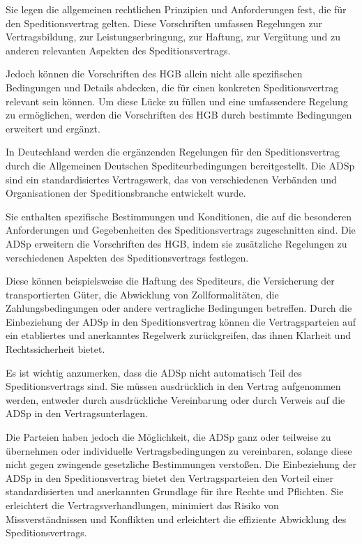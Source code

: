 Sie legen die allgemeinen rechtlichen Prinzipien und Anforderungen fest, die für den Speditionsvertrag gelten.
Diese Vorschriften umfassen Regelungen zur Vertragsbildung, zur Leistungserbringung, zur Haftung, zur Vergütung und zu anderen relevanten Aspekten des Speditionsvertrags.

Jedoch können die Vorschriften des HGB allein nicht alle spezifischen Bedingungen und Details abdecken, die für einen konkreten Speditionsvertrag relevant sein können.
Um diese Lücke zu füllen und eine umfassendere Regelung zu ermöglichen, werden die Vorschriften des HGB durch bestimmte Bedingungen erweitert und ergänzt.

In Deutschland werden die ergänzenden Regelungen für den Speditionsvertrag durch die Allgemeinen Deutschen Spediteurbedingungen bereitgestellt.
Die ADSp sind ein standardisiertes Vertragswerk, das von verschiedenen Verbänden und Organisationen der Speditionsbranche entwickelt wurde.

Sie enthalten spezifische Bestimmungen und Konditionen, die auf die besonderen Anforderungen und Gegebenheiten des Speditionsvertrags zugeschnitten sind.
Die ADSp erweitern die Vorschriften des HGB, indem sie zusätzliche Regelungen zu verschiedenen Aspekten des Speditionsvertrags festlegen.

Diese können beispielsweise die Haftung des Spediteurs, die Versicherung der transportierten Güter, die Abwicklung von Zollformalitäten, die Zahlungsbedingungen oder andere vertragliche Bedingungen betreffen.
Durch die Einbeziehung der ADSp in den Speditionsvertrag können die Vertragsparteien auf ein etabliertes und anerkanntes Regelwerk zurückgreifen, das ihnen Klarheit und Rechtssicherheit bietet.

Es ist wichtig anzumerken, dass die ADSp nicht automatisch Teil des Speditionsvertrags sind.
Sie müssen ausdrücklich in den Vertrag aufgenommen werden, entweder durch ausdrückliche Vereinbarung oder durch Verweis auf die ADSp in den Vertragsunterlagen.

Die Parteien haben jedoch die Möglichkeit, die ADSp ganz oder teilweise zu übernehmen oder individuelle Vertragsbedingungen zu vereinbaren, solange diese nicht gegen zwingende gesetzliche Bestimmungen verstoßen.
Die Einbeziehung der ADSp in den Speditionsvertrag bietet den Vertragsparteien den Vorteil einer standardisierten und anerkannten Grundlage für ihre Rechte und Pflichten.
Sie erleichtert die Vertragsverhandlungen, minimiert das Risiko von Missverständnissen und Konflikten und erleichtert die effiziente Abwicklung des Speditionsvertrags.

